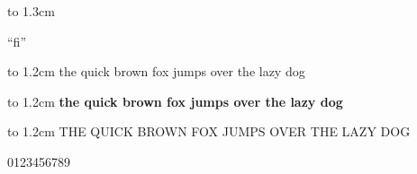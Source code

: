 \documentclass[10pt]{article}
\begin{document}
\vbox to 1.3cm{ %
{\LARGE ``fi''} %

}

\vbox to 1.2cm{
the quick brown fox jumps over the lazy dog
}

\vbox to 1.2cm{
\bfseries the quick brown fox jumps over the lazy dog
}

\vbox to 1.2cm{
THE QUICK BROWN FOX JUMPS OVER THE LAZY DOG
}

\vbox{
0123456789
}
\end{document}
